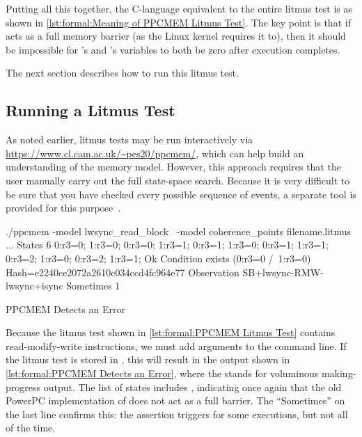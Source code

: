 \begin{fcvref}
Putting all this together, the C-language equivalent to the entire litmus
test is as shown in
\cref{lst:formal:Meaning of PPCMEM Litmus Test}.
The key point is that if  acts as a full
memory barrier (as the Linux kernel requires it to), 
then it should be impossible for 's and 's 
variables to both be zero after execution completes.

The next section describes how to run this litmus test.

\subsection{Running a Litmus Test}
\label{sec:formal:Running a Litmus Test}

As noted earlier, litmus tests may be run interactively via
\url{https://www.cl.cam.ac.uk/~pes20/ppcmem/}, which can help build an
understanding of the memory model.
However, this approach requires that the user manually carry out the
full state-space search.
Because it is very difficult to be sure that you have checked every
possible sequence of events, a separate tool is provided for this
purpose~\cite{PaulEMcKenney2011ppcmem}.

\begin{listing}[tbp]
\begin{VerbatimL}[numbers=none,xleftmargin=0pt]
./ppcmem -model lwsync_read_block \
         -model coherence_points filename.litmus
...
States 6
0:r3=0; 1:r3=0;
0:r3=0; 1:r3=1;
0:r3=1; 1:r3=0;
0:r3=1; 1:r3=1;
0:r3=2; 1:r3=0;
0:r3=2; 1:r3=1;
Ok
Condition exists (0:r3=0 /\ 1:r3=0)
Hash=e2240ce2072a2610c034ccd4fc964e77
Observation SB+lwsync-RMW-lwsync+isync Sometimes 1
\end{VerbatimL}
\caption{PPCMEM Detects an Error}
\label{lst:formal:PPCMEM Detects an Error}
\end{listing}

Because the litmus test shown in
\cref{lst:formal:PPCMEM Litmus Test}
contains read-modify-write instructions, we must add 
arguments to the command line.
If the litmus test is stored in ,
this will result in the output shown in
\cref{lst:formal:PPCMEM Detects an Error},
where the  stands for voluminous making-progress output.
The list of states includes \co{0:r3=0; 1:r3=0;}, indicating once again
that the old PowerPC implementation of \co{atomic_add_return()} does
not act as a full barrier.
The ``Sometimes'' on the last line confirms this: the assertion triggers
for some executions, but not all of the time.


\end{fcvref}
